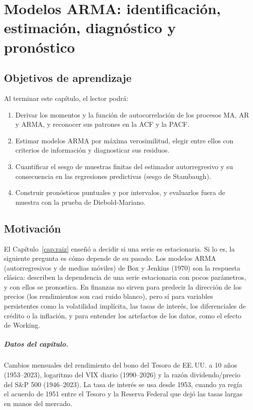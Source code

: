 \chapter[Modelos ARMA]{Modelos ARMA: identificación, estimación, diagnóstico y pronóstico}\label{cap:arma}

\section*{Objetivos de aprendizaje}
Al terminar este capítulo, el lector podrá:
\begin{enumerate}[label=\arabic*.,leftmargin=*]
  \item Derivar los momentos y la función de autocorrelación de los procesos MA, AR y ARMA, y reconocer sus
        patrones en la ACF y la PACF.
  \item Estimar modelos ARMA por máxima verosimilitud, elegir entre ellos con criterios de información y
        diagnosticar sus residuos.
  \item Cuantificar el sesgo de muestras finitas del estimador autorregresivo y su consecuencia en las
        regresiones predictivas (sesgo de Stambaugh).
  \item Construir pronósticos puntuales y por intervalos, y evaluarlos fuera de muestra con la prueba de
        Diebold-Mariano.
\end{enumerate}

\section*{Motivación}
El Capítulo~\ref{cap:raiz} enseñó a decidir si una serie es estacionaria. Si lo es, la siguiente pregunta es
cómo depende de su pasado. Los modelos ARMA (autorregresivos y de medias móviles) de Box y Jenkins (1970) son
la respuesta clásica: describen la dependencia de una serie estacionaria con pocos parámetros, y con ellos se
pronostica. En finanzas no sirven para predecir la dirección de los precios (los rendimientos son casi ruido
blanco), pero sí para variables persistentes como la volatilidad implícita, las tasas de interés, los
diferenciales de crédito o la inflación, y para entender los artefactos de los datos, como el efecto de
Working.

\paragraph{Datos del capítulo.} Cambios mensuales del rendimiento del bono del Tesoro de EE.\,UU. a 10 años
(1953--2023), logaritmo del VIX diario (1990--2026) y la razón dividendo/precio del S\&P 500 (1946--2023). La
tasa de interés se usa desde 1953, cuando ya regía el acuerdo de 1951 entre el Tesoro y la Reserva Federal
que dejó las tasas largas en manos del mercado.

